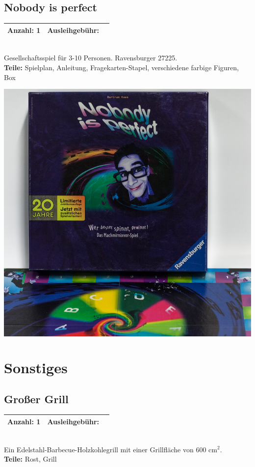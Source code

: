 \documentclass[a4paper]{article}
\newcommand{\infobox}[3] %
        {\par
                \begin{tabular}{| c | c | c| }
                \hline
                Anzahl: #1 & Ausleihgebühr: \EUR{#2}   \\
                \hline
                \end{tabular} \\
        }
\begin{document}
\subsection{Nobody is perfect}
\infobox{1}{0}{Neu}
Gesellschaftsspiel für 3-10 Personen. Ravensburger 27225. \\
\textbf{Teile:} Spielplan, Anleitung, Fragekarten-Stapel, verschiedene farbige Figuren, Box

\includegraphics[width=.3\textwidth]{Nobody is perfect.jpg}


\section{Sonstiges}

\subsection{Großer Grill}
\infobox{1}{5}{Neu}
Ein Edelstahl-Barbecue-Holzkohlegrill mit einer Grillfläche von 600 cm$^2$. \\
\textbf{Teile:} Rost, Grill

\end{document}
